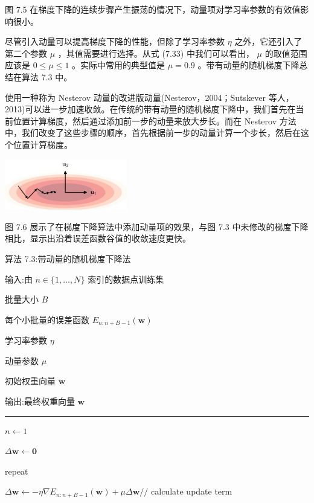 \documentclass[10pt]{report}
\newcommand{\HRule}{\begin{center}\rule{0.9\linewidth}{0.2mm}\end{center}}
\begin{document}
图 7.5 在梯度下降的连续步骤产生振荡的情况下，动量项对学习率参数的有效值影响很小。

尽管引入动量可以提高梯度下降的性能，但除了学习率参数 \(\eta\) 之外，它还引入了第二个参数 \(\mu\) ，其值需要进行选择。从式 (7.33) 中我们可以看出， \(\mu\) 的取值范围应该是 \(0 \leq  \mu  \leq  1\) 。实际中常用的典型值是 \(\mu  = {0.9}\) 。带有动量的随机梯度下降总结在算法 7.3 中。

使用一种称为 Nesterov 动量的改进版动量(Nesterov，2004；Sutskever 等人，2013)可以进一步加速收敛。在传统的带有动量的随机梯度下降中，我们首先在当前位置计算梯度，然后通过添加前一步的动量来放大步长。而在 Nesterov 方法中，我们改变了这些步骤的顺序，首先根据前一步的动量计算一个步长，然后在这个位置计算梯度。

\begin{center}
\includegraphics[max width=0.4\textwidth]{images/0194e279-9b28-703a-88f4-c3ac21e2010d_240_970_1646_569_236_0.jpg}
\end{center}
\hspace*{3em} 

图 7.6 展示了在梯度下降算法中添加动量项的效果，与图 7.3 中未修改的梯度下降相比，显示出沿着误差函数谷值的收敛速度更快。

算法 7.3:带动量的随机梯度下降法

输入:由 \(n \in  \{ 1,\ldots ,N\}\) 索引的数据点训练集

批量大小 \(B\)

每个小批量的误差函数 \({E}_{n : n + B - 1}\left( \mathbf{w}\right)\)

学习率参数 \(\eta\)

动量参数 \(\mu\)

初始权重向量 \(\mathbf{w}\)

输出:最终权重向量 \(\mathbf{w}\)

\HRule

\(n \leftarrow  1\)

\(\Delta \mathbf{w} \leftarrow  \mathbf{0}\)

repeat

\hspace*{1em} \(\Delta \mathbf{w} \leftarrow   - \eta \nabla {E}_{n : n + B - 1}\left( \mathbf{w}\right)  + {\mu \Delta }\mathbf{w}//\) calculate update term
\end{document}
